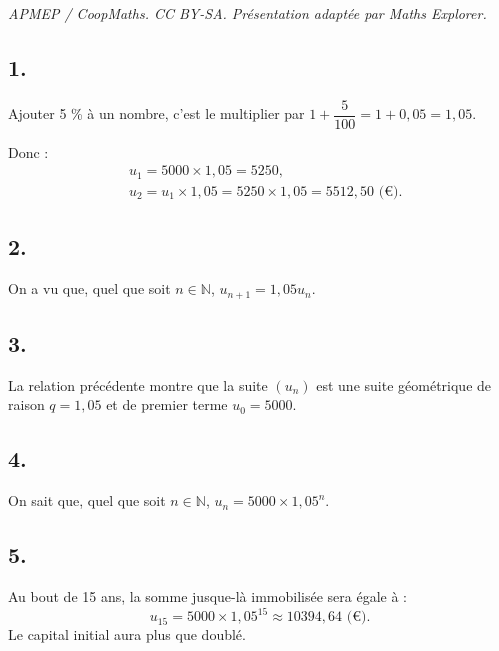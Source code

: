 \documentclass[10pt]{article}
\begin{document}
\noindent\textit{APMEP / CoopMaths. CC BY-SA. Présentation adaptée par Maths Explorer.}\par\medskip
\subsection*{1.}

Ajouter 5 \% à un nombre, c'est le multiplier par \(1 + \dfrac{5}{100} = 1 + 0{,}05= 1{,}05\).

Donc :
\begin{align*}
&u_1 = 5000 \times 1{,}05 = 5250, \\
&u_2 = u_1 \times 1{,}05 = 5250 \times 1{,}05 = 5512{,}50 \text{ (€)}.
\end{align*}

\subsection*{2.}

On a vu que, quel que soit \(n \in \mathbb{N}\), \(u_{n+1} = 1{,}05u_n\).

\subsection*{3.}

La relation précédente montre que la suite \( (u_n) \) est une suite géométrique de raison \(q = 1{,}05\) et de premier terme \(u_0 = 5000\).

\subsection*{4.}

On sait que, quel que soit \(n \in \mathbb{N}\), \(u_n = 5000 \times 1{,}05^n\).

\subsection*{5.}

Au bout de 15 ans, la somme jusque-là immobilisée sera égale à :
\[
u_{15} = 5000 \times 1{,}05^{15} \approx 10394{,}64 \text{ (€)}.
\]
Le capital initial aura plus que doublé.
\end{document}
